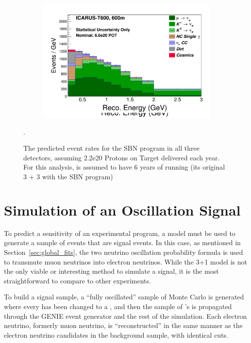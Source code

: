 \begin{figure}[]
\begin{subfigure}[]{0.49\textwidth}
    \end{subfigure}
    \\
    \begin{subfigure}[]{0.49\textwidth}
        \centering
        \includegraphics[width=\textwidth]{sbn_figures/nominal_nue_appearance_nosig_ICARUS-T600_600m}
    \end{subfigure}
    \caption{The predicted event rates for the SBN program in all three detectors, assuming 2.2e20 Protons on Target delivered each year.  For this analysis, \uboone is assumed to have 6 years of running (its original 3 + 3 with the SBN program)}.
   \label{fig:sbn_event_rates_no_signal}
\end{figure}

\section{Simulation of an Oscillation Signal}

To predict a sensitivity of an experimental program, a model must be used to generate a sample of events that are signal events.  In this case, as mentioned in Section~\ref{sec:global_fits}, the two neutrino oscillation probability formula is used to transmute muon neutrinos into electron neutrinos.  While the 3+1 model is not the only viable or interesting method to simulate a signal, it is the most straightforward to compare to other experiments.  

To build a signal sample, a ``fully oscillated'' sample of Monte Carlo is generated where every \numu has been changed to a \nue, and then the sample of \nue's is propagated through the GENIE event generator and the rest of the simulation.  Each electron neutrino, formerly muon neutrino, is ``reconstructed'' in the same manner as the electron neutrino candidates in the background sample, with identical cuts.  


